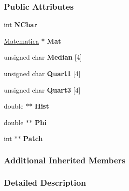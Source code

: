 \subsubsection*{Public Attributes}
\begin{DoxyCompactItemize}
\item 
int {\bfseries N\+Char}\hypertarget{classDrEffect_ab838279ebd63d393a2b2d1869f938130}{}\label{classDrEffect_ab838279ebd63d393a2b2d1869f938130}

\item 
\hyperlink{classMatematica}{Matematica} $\ast$ {\bfseries Mat}\hypertarget{classDrEffect_aab4995eedc5bb0d45d86f0e2a5d0e869}{}\label{classDrEffect_aab4995eedc5bb0d45d86f0e2a5d0e869}

\item 
unsigned char {\bfseries Median} \mbox{[}4\mbox{]}\hypertarget{classDrEffect_a4c5ab80dcdf3fd65635f5aaf226b8134}{}\label{classDrEffect_a4c5ab80dcdf3fd65635f5aaf226b8134}

\item 
unsigned char {\bfseries Quart1} \mbox{[}4\mbox{]}\hypertarget{classDrEffect_a18ba95d201a709a76b4851c640d78cc3}{}\label{classDrEffect_a18ba95d201a709a76b4851c640d78cc3}

\item 
unsigned char {\bfseries Quart3} \mbox{[}4\mbox{]}\hypertarget{classDrEffect_a74095d8f0e65d6a5f72e6e9cb5b3a469}{}\label{classDrEffect_a74095d8f0e65d6a5f72e6e9cb5b3a469}

\item 
double $\ast$$\ast$ {\bfseries Hist}\hypertarget{classDrEffect_a2d8866b988a2fa30ad757e8bfb06e572}{}\label{classDrEffect_a2d8866b988a2fa30ad757e8bfb06e572}

\item 
double $\ast$$\ast$ {\bfseries Phi}\hypertarget{classDrEffect_a7bc31eadf9a4b6f445e0108719dcebab}{}\label{classDrEffect_a7bc31eadf9a4b6f445e0108719dcebab}

\item 
int $\ast$$\ast$ {\bfseries Patch}\hypertarget{classDrEffect_a6ba57c41c047bfa956eff1c7086af325}{}\label{classDrEffect_a6ba57c41c047bfa956eff1c7086af325}

\end{DoxyCompactItemize}
\subsubsection*{Additional Inherited Members}


\subsubsection{Detailed Description}


